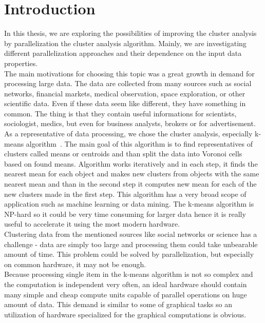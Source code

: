 \pagestyle{plain}
\setcounter{page}{1}

\chapter{Introduction}

In this thesis, we are exploring the possibilities of improving the cluster analysis by parallelization the cluster analysis algorithm. Mainly, we are investigating different parallelization approaches and their dependence on the input data properties.\\
The main motivations for choosing this topic was a great growth in demand for processing large data. The data are collected from many sources such as social networks, financial markets, medical observation, space exploration, or other scientific data. Even if these data seem like different, they have something in common. The thing is that they contain useful informations for scientists, sociologist, medics, but even for business analysts, brokers or for advertisement. \\

As a representative of data processing, we chose the cluster analysis, especially k-means algorithm~\cite{Aggarwal13, EstivillCastro02}. The main goal of this algorithm is to find representatives of clusters called means or centroids and than split the data into Voronoi cells~\cite{Kim14} based on found means. Algorithm works iteratively and in each step, it finds the nearest mean for each object and makes new clusters from objects with the same nearest mean and than in the second step it computes new mean for each of the new clusters made in the first step. This algorithm has a very broad scope of application such as machine learning or data mining. The k-means algorithm is NP-hard so it could be very time consuming for larger data hence it is really useful to accelerate it using the most modern hardware.\\

Clustering data from the mentioned sources like social networks or science has a challenge - data are simply too large and processing them could take unbearable amount of time. This problem could be solved by parallelization, but especially on common hardware, it may not be enough. \\
Because processing single item in the k-means algorithm is not so complex and the computation is independent very often, an ideal hardware should contain many simple and cheap compute units capable of parallel operations on huge amount of data. This demand is similar to some of graphical tasks so an utilization of hardware specialized for the graphical computations is obvious.\\

